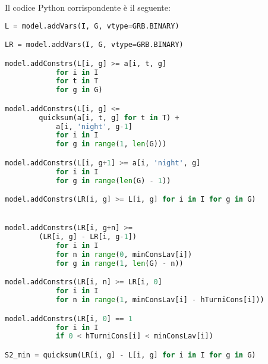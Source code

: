 Il codice Python corrispondente è il seguente:
\begin{lstlisting}[language=Python]
L = model.addVars(I, G, vtype=GRB.BINARY)

LR = model.addVars(I, G, vtype=GRB.BINARY)

model.addConstrs(L[i, g] >= a[i, t, g]
            for i in I
            for t in T
            for g in G)

model.addConstrs(L[i, g] <= 
		quicksum(a[i, t, g] for t in T) + 
			a[i, 'night', g-1]
            for i in I
            for g in range(1, len(G)))

model.addConstrs(L[i, g+1] >= a[i, 'night', g]
            for i in I
            for g in range(len(G) - 1))

model.addConstrs(LR[i, g] >= L[i, g] for i in I for g in G)


model.addConstrs(LR[i, g+n] >= 
		(LR[i, g] - LR[i, g-1])
            for i in I
            for n in range(0, minConsLav[i])
            for g in range(1, len(G) - n))

model.addConstrs(LR[i, n] >= LR[i, 0]
            for i in I
            for n in range(1, minConsLav[i] - hTurniCons[i]))

model.addConstrs(LR[i, 0] == 1
            for i in I
            if 0 < hTurniCons[i] < minConsLav[i])

S2_min = quicksum(LR[i, g] - L[i, g] for i in I for g in G)

\end{lstlisting}

